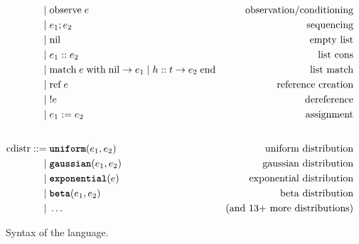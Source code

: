\begin{figure}[h]
\begin{align*}
    | &\; \text{observe}\; e              & \text{observation/conditioning} \\
    | &\; e_1; e_2                        & \text{sequencing} \\
    | &\; \text{nil}                      & \text{empty list} \\
    | &\; e_1 :: e_2                      & \text{list cons} \\
    | &\; \text{match}\; e\; \text{with}\; \text{nil} \rightarrow e_1 \mid h :: t \rightarrow e_2\; \text{end} & \text{list match} \\
    | &\; \text{ref}\; e                  & \text{reference creation} \\
    | &\; !e                              & \text{dereference} \\
    | &\; e_1 := e_2                      & \text{assignment} \\
    \\[1ex] %
\text{cdistr} ::= &\; \uniform(e_1, e_2)      & \text{uniform distribution} \\
           | &\; \gaussian(e_1, e_2)   & \text{gaussian distribution} \\
           | &\; \exponential(e)       & \text{exponential distribution} \\
           | &\; \betafn(e_1, e_2)     & \text{beta distribution} \\
           | &\; \ldots                & \text{(and 13+ more distributions)}
\end{align*}
\caption{Syntax of the \Slice{} language.}
\label{fig:grammar}
\end{figure}